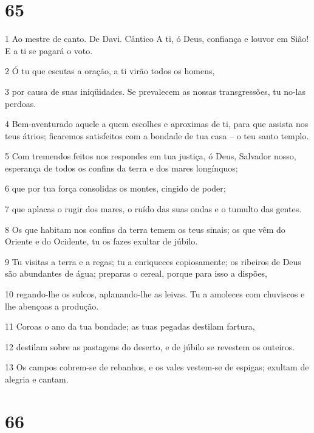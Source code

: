 \chapter{65}

\par 1 Ao mestre de canto. De Davi. Cântico A ti, ó Deus, confiança e louvor em Sião! E a ti se pagará o voto.
\par 2 Ó tu que escutas a oração, a ti virão todos os homens,
\par 3 por causa de suas iniqüidades. Se prevalecem as nossas transgressões, tu no-las perdoas.
\par 4 Bem-aventurado aquele a quem escolhes e aproximas de ti, para que assista nos teus átrios; ficaremos satisfeitos com a bondade de tua casa -- o teu santo templo.
\par 5 Com tremendos feitos nos respondes em tua justiça, ó Deus, Salvador nosso, esperança de todos os confins da terra e dos mares longínquos;
\par 6 que por tua força consolidas os montes, cingido de poder;
\par 7 que aplacas o rugir dos mares, o ruído das suas ondas e o tumulto das gentes.
\par 8 Os que habitam nos confins da terra temem os teus sinais; os que vêm do Oriente e do Ocidente, tu os fazes exultar de júbilo.
\par 9 Tu visitas a terra e a regas; tu a enriqueces copiosamente; os ribeiros de Deus são abundantes de água; preparas o cereal, porque para isso a dispões,
\par 10 regando-lhe os sulcos, aplanando-lhe as leivas. Tu a amoleces com chuviscos e lhe abençoas a produção.
\par 11 Coroas o ano da tua bondade; as tuas pegadas destilam fartura,
\par 12 destilam sobre as pastagens do deserto, e de júbilo se revestem os outeiros.
\par 13 Os campos cobrem-se de rebanhos, e os vales vestem-se de espigas; exultam de alegria e cantam.

\chapter{66}

